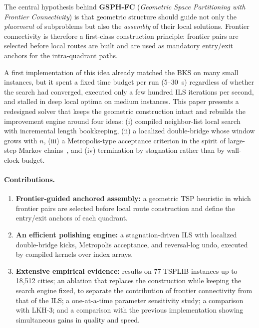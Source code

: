 \documentclass[runningheads]{llncs}
\begin{document}
The central hypothesis behind \textbf{GSPH-FC} (\textit{Geometric Space
Partitioning with Frontier Connectivity}) is that geometric structure
should guide not only the \emph{placement} of subproblems but also the
\emph{assembly} of their local solutions. Frontier connectivity is
therefore a first-class construction principle: frontier pairs are
selected before local routes are built and are used as mandatory
entry/exit anchors for the intra-quadrant paths.

A first implementation of this idea already matched the BKS on many
small instances, but it spent a fixed time budget per run (5--30~s)
regardless of whether the search had converged, executed only a few
hundred ILS iterations per second, and stalled in deep local optima
on medium instances. This paper presents a redesigned solver that
keeps the geometric construction intact and rebuilds the improvement
engine around four ideas: (i) compiled neighbor-list local search with
incremental length bookkeeping, (ii) a localized double-bridge whose
window grows with $n$, (iii) a Metropolis-type acceptance criterion in
the spirit of large-step Markov chains~\cite{martin1991large,kirkpatrick1983optimization},
and (iv) termination by stagnation rather than by wall-clock budget.

\paragraph{Contributions.}
\begin{enumerate}
  \item \textbf{Frontier-guided anchored assembly:} a geometric TSP
    heuristic in which frontier pairs are selected before local route
    construction and define the entry/exit anchors of each quadrant.
  \item \textbf{An efficient polishing engine:} a stagnation-driven ILS
    with localized double-bridge kicks, Metropolis acceptance, and
    reversal-log undo, executed by compiled kernels over index arrays.
  \item \textbf{Extensive empirical evidence:} results on 77
    TSPLIB instances up to 18{,}512 cities; an ablation that replaces the
    construction while keeping the search engine fixed, to separate the
    contribution of frontier connectivity from that of the ILS; a
    one-at-a-time parameter sensitivity study; a comparison with LKH-3;
    and a comparison with the previous implementation showing
    simultaneous gains in quality and speed.
\end{enumerate}
\end{document}
